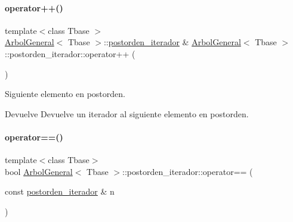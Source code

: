 \hypertarget{classArbolGeneral_1_1postorden__iterador_a3b2f2622714676de99e67aa27a410b68}{}\label{classArbolGeneral_1_1postorden__iterador_a3b2f2622714676de99e67aa27a410b68} 
\paragraph{\texorpdfstring{operator++()}{operator++()}}
{\footnotesize\ttfamily template$<$class Tbase $>$ \\
\hyperlink{classArbolGeneral}{Arbol\+General}$<$ Tbase $>$\+::\hyperlink{classArbolGeneral_1_1postorden__iterador}{postorden\+\_\+iterador} \& \hyperlink{classArbolGeneral}{Arbol\+General}$<$ Tbase $>$\+::postorden\+\_\+iterador\+::operator++ (\begin{DoxyParamCaption}{ }\end{DoxyParamCaption})}



Siguiente elemento en postorden. 

\begin{DoxyReturn}{Devuelve}
Devuelve un iterador al siguiente elemento en postorden. 
\end{DoxyReturn}
\hypertarget{classArbolGeneral_1_1postorden__iterador_a3c823a060b37ab5be8a950b5a79188d3}{}\label{classArbolGeneral_1_1postorden__iterador_a3c823a060b37ab5be8a950b5a79188d3} 
\paragraph{\texorpdfstring{operator==()}{operator==()}}
{\footnotesize\ttfamily template$<$class Tbase$>$ \\
bool \hyperlink{classArbolGeneral}{Arbol\+General}$<$ Tbase $>$\+::postorden\+\_\+iterador\+::operator== (\begin{DoxyParamCaption}\item[{const \hyperlink{classArbolGeneral_1_1postorden__iterador}{postorden\+\_\+iterador} \&}]{n }\end{DoxyParamCaption})\hspace{0.3cm}{\ttfamily [inline]}}



